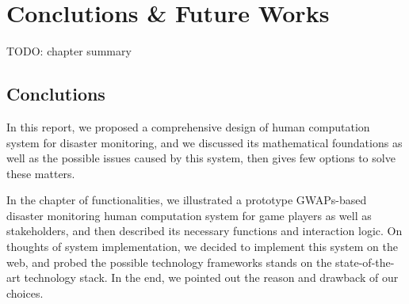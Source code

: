 \section{Conclutions \& Future Works}

TODO: chapter summary

\subsection{Conclutions}

In this report, we proposed a comprehensive design of human computation system for disaster monitoring,
and we discussed its mathematical foundations as well as the possible issues caused by this system,
then gives few options to solve these matters. 

In the chapter of functionalities, we illustrated a prototype GWAPs-based disaster monitoring
human computation system for game players as well as stakeholders, and then described its
necessary functions and interaction logic. On thoughts of system implementation, we decided to implement 
this system on the web, and probed the possible technology frameworks stands on the state-of-the-art technology stack.
In the end, we pointed out the reason and drawback of our choices.

